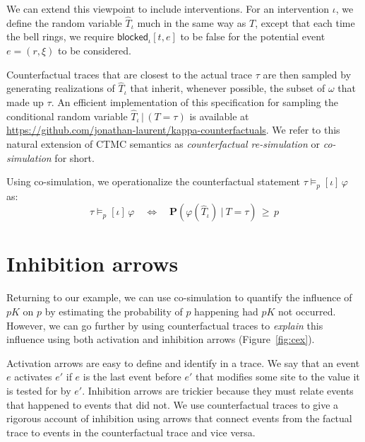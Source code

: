 We can extend this viewpoint to include interventions. For an intervention $\iota$, we define the random variable $\hat T_\iota$ much in the same way as $T$, except that each time the bell rings, we require $\textsf{blocked}_\iota[t, e]$ to be false for the potential event $e=(r, \xi)$ to be considered. 

Counterfactual traces that are closest to the actual trace $\tau$ are then sampled by generating realizations of $\hat T_\iota$ that inherit, whenever possible, the subset of $\omega$ that made up $\tau$. An efficient implementation of this specification for sampling the conditional random variable ${\hat T}_\iota \,|\, (T = \tau)$ is available at \url{https://github.com/jonathan-laurent/kappa-counterfactuals}. We refer to this natural extension of CTMC semantics as \textit{counterfactual re-simulation} or \textit{co-simulation} for short.

Using co-simulation, we operationalize the counterfactual statement $ \tau \models_p [\iota] \, \varphi $ as:
\[ \tau \models_p [\iota] \, \varphi \quad \Leftrightarrow 
\quad \mathbf{P}( \varphi(\hat T_\iota) \ |\  T = \tau) \,\geq\, p \]

\section{Inhibition arrows}\label{sec:inhibition}

Returning to our example, we can use co-simulation to quantify the influence of $pK$ on $p$ by estimating the probability of $p$ happening had $pK$ not occurred. However, we can go further by using counterfactual traces to \textit{explain} this influence using both activation and inhibition arrows (Figure~\ref{fig:cex}).

Activation arrows are easy to define and identify in a trace. We say that an event $e$ activates $e'$ if $e$ is the last event before $e'$ that modifies some site to the value it is tested for by $e'$. Inhibition arrows are trickier because they must relate events that happened to events that did not. We use counterfactual traces to give a rigorous account of inhibition using arrows that connect events from the factual trace to events in the counterfactual trace and vice versa.


